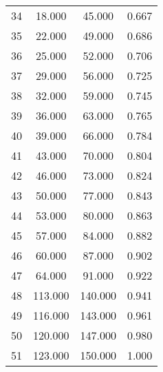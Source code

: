 \begin{tabular}{cccc}
  34 & 18.000 & 45.000 & 0.667 \\ 
  35 & 22.000 & 49.000 & 0.686 \\ 
  36 & 25.000 & 52.000 & 0.706 \\ 
  37 & 29.000 & 56.000 & 0.725 \\ 
  38 & 32.000 & 59.000 & 0.745 \\ 
  39 & 36.000 & 63.000 & 0.765 \\ 
  40 & 39.000 & 66.000 & 0.784 \\ 
  41 & 43.000 & 70.000 & 0.804 \\ 
  42 & 46.000 & 73.000 & 0.824 \\ 
  43 & 50.000 & 77.000 & 0.843 \\ 
  44 & 53.000 & 80.000 & 0.863 \\ 
  45 & 57.000 & 84.000 & 0.882 \\ 
  46 & 60.000 & 87.000 & 0.902 \\ 
  47 & 64.000 & 91.000 & 0.922 \\ 
  48 & 113.000 & 140.000 & 0.941 \\ 
  49 & 116.000 & 143.000 & 0.961 \\ 
  50 & 120.000 & 147.000 & 0.980 \\ 
  51 & 123.000 & 150.000 & 1.000 \\ 
   \hline
\end{tabular}
